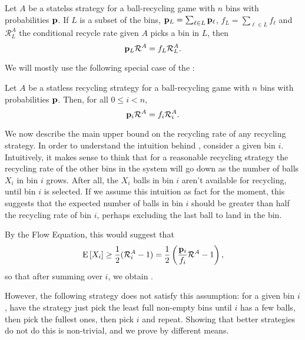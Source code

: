 \begin{lemma} \label{lem:gen-flow-equation}
	Let $A$ be a statelss strategy for a ball-recycling game with $n$ bins with
	probabilities $\mathbf{p}$. If $L$ is a subset of the bins, $\mathbf{p}_L = \sum_{\ell \in
	L} \mathbf{p}_\ell$, $f_L = \sum_{\ell \in L} f_\ell$ and $\mathcal{R}_L^A$ the
	conditional recycle rate given $A$ picks a bin in $L$, then
	\begin{equation}
		\mathbf{p}_L\mathcal{R}^A = f_L\mathcal{R}_L^A.
	\end{equation}
\end{lemma}

We will mostly use the following special case of the
: 

\begin{lemma} \label{lem:flow-equation}
	Let $A$ be a statless recycling strategy for a ball-recycling game with $n$
	bins with probabilities $\mathbf{p}$.  Then, for all $0\leq i < n$,
	\begin{equation}
		\mathbf{p}_i\mathcal{R}^A = f_i\mathcal{R}_i^A.
	\end{equation}
\end{lemma}

We now describe the main upper bound on the recycling rate of any recycling
strategy. In order to understand the intuition behind ,
consider a given bin $i$. Intuitively, it makes sense to think that for a
reasonable recycling strategy the recycling rate of the other bins in the
system will go down as the number of balls $X_i$ in bin $i$ grows.  After all,
the $X_i$ balls in bin $i$ aren't available for recycling, until bin $i$ is
selected. If we assume this intuition as fact for the moment, this suggests
that the expected number of balls in bin $i$ should be greater than half the
recycling rate of bin $i$, perhaps excluding the last ball to land in the bin.

By the Flow Equation, this would suggest that
\[ \mathrm{E}\left[X_i\right] \geq \frac{1}{2}(\mathcal{R}_i^A - 1) =
\frac{1}{2}\left(\frac{\mathbf{p}_i}{f_i}\mathcal{R}^A - 1\right), \]
so that after summing over $i$, we obtain .

However, the following strategy does not satisfy this assumption: for a given
bin $i$, have the strategy just pick the least full non-empty bins until $i$
has a few balls, then pick the fullest ones, then pick $i$ and repeat. Showing
that better strategies do not do this is non-trivial, and we prove
 by different means.

